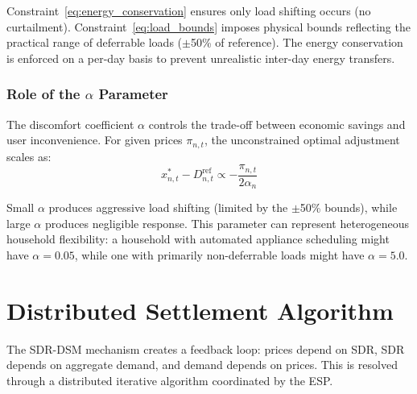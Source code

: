 \documentclass[pdflatex,sn-mathphys-num]{sn-jnl}
\theoremstyle{thmstyleone}
\theoremstyle{thmstyletwo}
\begin{document}
Constraint~\eqref{eq:energy_conservation} ensures only load shifting occurs (no curtailment). Constraint~\eqref{eq:load_bounds} imposes physical bounds reflecting the practical range of deferrable loads ($\pm$50\% of reference). The energy conservation is enforced on a per-day basis to prevent unrealistic inter-day energy transfers.

\subsubsection{Role of the $\alpha$ Parameter}

The discomfort coefficient $\alpha$ controls the trade-off between economic savings and user inconvenience. For given prices $\pi_{n,t}$, the unconstrained optimal adjustment scales as:
\begin{equation}
    x_{n,t}^* - D_{n,t}^{\text{ref}} \propto -\frac{\pi_{n,t}}{2\alpha_n}
    \label{eq:alpha_scaling}
\end{equation}

Small $\alpha$ produces aggressive load shifting (limited by the $\pm$50\% bounds), while large $\alpha$ produces negligible response. This parameter can represent heterogeneous household flexibility: a household with automated appliance scheduling might have $\alpha = 0.05$, while one with primarily non-deferrable loads might have $\alpha = 5.0$.

\section{Distributed Settlement Algorithm}\label{sec:algorithm}

The SDR-DSM mechanism creates a feedback loop: prices depend on SDR, SDR depends on aggregate demand, and demand depends on prices. This is resolved through a distributed iterative algorithm coordinated by the ESP.
\end{document}
